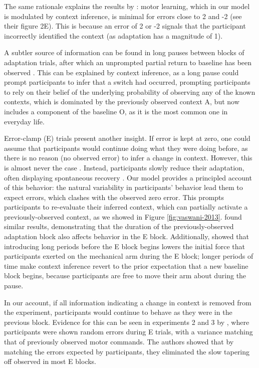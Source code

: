 \documentclass[a4paper,doc,floatsintext,natbib]{apa6}%
\def \fref #1{Figure \ref{#1}}     %
\begin{document}
The same rationale explains the results by \cite{Davidson_Scaling_2004}: motor learning, which in our model is modulated by context inference, is minimal for errors close to 2 and -2 (see their figure 2E). This is because an error of 2 or -2 signals that the participant incorrectly identified the context (as adaptation has a magnitude of 1).

A subtler source of information can be found in long pauses between blocks of adaptation trials, after which an unprompted partial return to baseline has been observed \cite{Ethier_Spontaneous_2008}. This can be explained by context inference, as a long pause could prompt participants to infer that a switch had occurred, prompting participants to rely on their belief of the underlying probability of observing any of the known contexts, which is dominated by the previously observed context A, but now includes a component of the baseline O, as it is the most common one in everyday life.

Error-clamp (E) trials present another insight. If error is kept at zero, one could assume that participants would continue doing what they were doing before, as there is no reason (no observed error) to infer a change in context. However, this is almost never the case \cite[e.g.][]{Smith_Interacting_2006,Ethier_Spontaneous_2008,Forano_Timescales_2020,Vaswani_Decay_2013,Scheidt_Persistence_2000,Pekny_Protection_2011}. Instead, participants slowly reduce their adaptation, often displaying spontaneous recovery \cite[e.g.][]{Smith_Interacting_2006}. Our model provides a principled account of this behavior: the natural variability in participants' behavior lead them to expect errors, which clashes with the observed zero error. This prompts participants to re-evaluate their inferred context, which can partially activate a previously-observed context, as we showed in \fref{fig:vaswani-2013}. \cite{Pekny_Protection_2011} found similar results, demonstrating that the duration of the previously-observed adaptation block also affects behavior in the E block. Additionally, \cite{Criscimagna-Hemminger_Consolidation_2008} showed that introducing long periods before the E block begins lowers the initial force that participants exerted on the mechanical arm during the E block; longer periods of time make context inference revert to the prior expectation that a new baseline block begins, because participants are free to move their arm about during the pause.

In our account, if all information indicating a change in context is removed from the experiment, participants would continue to behave as they were in the previous block. Evidence for this can be seen in experiments 2 and 3 by \cite{Vaswani_Decay_2013}, where participants were shown random errors during E trials, with a variance matching that of previously observed motor commands. The authors showed that by matching the errors expected by participants, they eliminated the slow tapering off observed in most E blocks.
\end{document}
